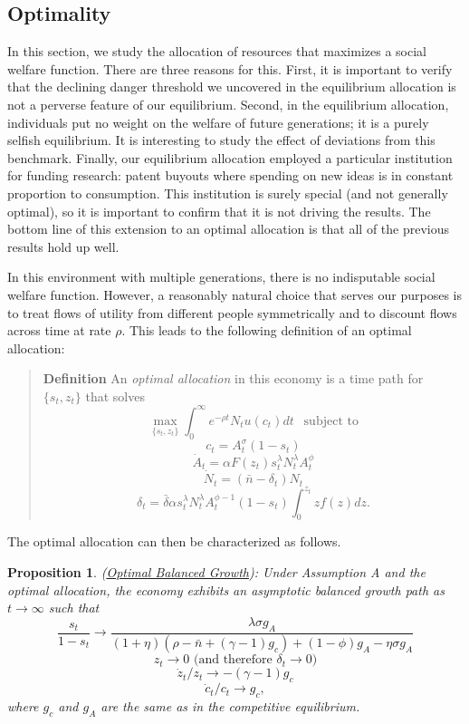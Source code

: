 \documentclass[12pt,twoside]{article}
\newcommand{\proptitle}[1]{\color{ChadBlue} \textnormal{(#1):}}
\newtheorem{proposition}{\color{ChadGreen} Proposition}
\begin{document}
\subsection{Optimality}

In this section, we study the allocation of resources that maximizes a
social welfare function. There are three reasons for this. First, it is
important to verify that the declining danger threshold we uncovered in
the equilibrium allocation is not a perverse feature of our equilibrium.
Second, in the equilibrium allocation, individuals put no weight on the
welfare of future generations; it is a purely selfish equilibrium. It is
interesting to study the effect of deviations from this benchmark.
Finally, our equilibrium allocation employed a particular institution
for funding research: patent buyouts where spending on new ideas is in
constant proportion to consumption. This institution is surely special
(and not generally optimal), so it is important to confirm that it is
not driving the results.  The bottom line of this extension to an
optimal allocation is that all of the previous results hold up well.

In this environment with multiple generations, there is no indisputable
social welfare function. However, a reasonably natural choice that
serves our purposes is to treat flows of utility from different people
symmetrically and to discount flows across time at rate $\rho$. This
leads to the following definition of an optimal allocation:

{\color{ChadBlue}
\begin{quote}
{\bf {Definition}}
An {\it optimal allocation} in this economy is a time path for $\{s_t,
z_t\}$ that solves
\[ \max_{\{s_t,z_t\}} \int_0 ^\infty e^{-\rho t} N_t
u(c_t) dt \ \ \mbox{ subject to}\]
\[ c_t =A_t ^\sigma (1-s_t) \]
\[ \dot{A}_t = \alpha F(z_t) s_t ^\lambda N_t ^\lambda A_t ^\phi \]
\[ \dot{N}_t = (\bar{n}-\delta_t) N_t \]
\[ \delta_t = \bar{\delta} \alpha s_t ^\lambda N_t ^\lambda A_t
^{\phi-1} (1-s_t) \int_0 ^{z_t} zf(z)dz. \]
\end{quote}}

The optimal allocation can then be characterized as follows.

\begin{proposition}
\proptitle{\hyperlink{proof:swf}{Optimal Balanced Growth}}
\label{prop:swf} \hypertarget{prop:swf}{}
Under Assumption A and the optimal allocation, the economy exhibits an
asymptotic balanced growth path as $t \rightarrow \infty$ such that
\[ \frac{s_t}{1-s_t} \rightarrow \frac{\lambda \sigma g_A}
{(1+\eta)(\rho-\bar{n}+(\gamma-1)g_c) +(1-\phi)g_A - \eta \sigma g_A} \]
\[ z_t \rightarrow 0 \mbox{ (and therefore } \delta_t \rightarrow 0
\mbox{)}  \]
\[ \dot{z}_t/z_t \rightarrow - (\gamma-1) g_c  \]
\[ \dot{c}_t/c_t \rightarrow g_c, \]
where $g_c$ and $g_A$ are the same as in the competitive equilibrium.
\end{proposition}
\end{document}
